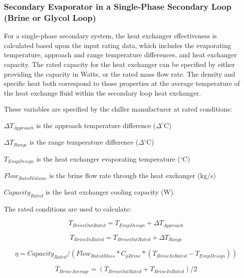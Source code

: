 \subsubsection{Secondary Evaporator in a Single-Phase Secondary Loop (Brine or Glycol Loop)}\label{secondary-evaporator-in-a-single-phase-secondary-loop-brine-or-glycol-loop}

For a single-phase secondary system, the heat exchanger effectiveness is calculated based upon the input rating data, which includes the evaporating temperature, approach and range temperature differences, and heat exchanger capacity. The rated capacity for the heat exchanger can be specified by either providing the capacity in Watts, or the rated mass flow rate. The density and specific heat both correspond to those properties at the average temperature of the heat exchange fluid within the secondary loop heat exchanger.

These variables are specified by the chiller manufacturer at rated conditions:

\(\Delta T_{Approach}\) is the approach temperature difference (\(\Delta^{\circ}\)C)

\(\Delta T_{Range}\) is the range temperature difference (\(\Delta^{\circ}\)C)

\(T_{EvapDesign}\) is the heat exchanger evaporating temperature (\(^{\circ}\)C)

\(Flow_{RatedVolume}\) is the brine flow rate through the heat exchanger (kg/s)

\(Capacity_{Rated}\) is the heat exchanger cooling capacity (W).

The rated conditions are used to calculate:

\begin{equation}
T_{BrineOutRated} = T_{EvapDesign} + \Delta T_{Approach}
\end{equation}

\begin{equation}
T_{BrineInRated} = T_{BrineOutRated} + \Delta T_{Range}
\end{equation}

\begin{equation}
\eta = Capacity_{Rated} / (Flow_{RatedMass} * C_{pBrine} * (T_{BrineInRated} - T_{EvapDesign}))
\end{equation}

\begin{equation}
T_{BrineAverage} = (T_{BrineOutRated} + T_{BrineInRated})/2
\end{equation}

